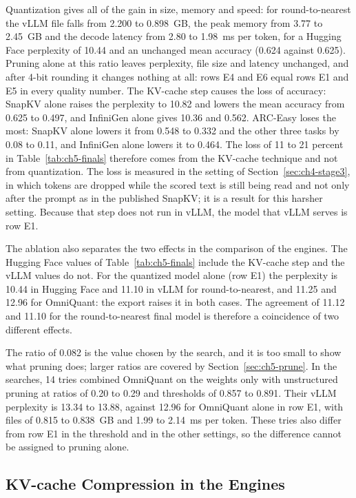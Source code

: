 \documentclass[
11pt, %
english, %
singlespacing, %
headsepline, %
]{MastersDoctoralThesis} %
\begin{document}
Quantization gives all of the gain in size, memory and speed: for round-to-nearest the vLLM file falls from 2.200 to 0.898~GB, the peak memory from 3.77 to 2.45~GB and the decode latency from 2.80 to 1.98~ms per token, for a Hugging Face perplexity of 10.44 and an unchanged mean accuracy (0.624 against 0.625). Pruning alone at this ratio leaves perplexity, file size and latency unchanged, and after 4-bit rounding it changes nothing at all: rows E4 and E6 equal rows E1 and E5 in every quality number. The KV-cache step causes the loss of accuracy: SnapKV alone raises the perplexity to 10.82 and lowers the mean accuracy from 0.625 to 0.497, and InfiniGen alone gives 10.36 and 0.562. ARC-Easy loses the most: SnapKV alone lowers it from 0.548 to 0.332 and the other three tasks by 0.08 to 0.11, and InfiniGen alone lowers it to 0.464. The loss of 11 to 21 percent in Table~\ref{tab:ch5-finals} therefore comes from the KV-cache technique and not from quantization. The loss is measured in the setting of Section~\ref{sec:ch4-stage3}, in which tokens are dropped while the scored text is still being read and not only after the prompt as in the published SnapKV; it is a result for this harsher setting. Because that step does not run in vLLM, the model that vLLM serves is row E1.

The ablation also separates the two effects in the comparison of the engines. The Hugging Face values of Table~\ref{tab:ch5-finals} include the KV-cache step and the vLLM values do not. For the quantized model alone (row E1) the perplexity is 10.44 in Hugging Face and 11.10 in vLLM for round-to-nearest, and 11.25 and 12.96 for OmniQuant: the export raises it in both cases. The agreement of 11.12 and 11.10 for the round-to-nearest final model is therefore a coincidence of two different effects.

The ratio of 0.082 is the value chosen by the search, and it is too small to show what pruning does; larger ratios are covered by Section~\ref{sec:ch5-prune}. In the searches, 14 tries combined OmniQuant on the weights only with unstructured pruning at ratios of 0.20 to 0.29 and thresholds of 0.857 to 0.891. Their vLLM perplexity is 13.34 to 13.88, against 12.96 for OmniQuant alone in row E1, with files of 0.815 to 0.838~GB and 1.99 to 2.14~ms per token. These tries also differ from row E1 in the threshold and in the other settings, so the difference cannot be assigned to pruning alone.

\subsection{KV-cache Compression in the Engines}
\end{document}
